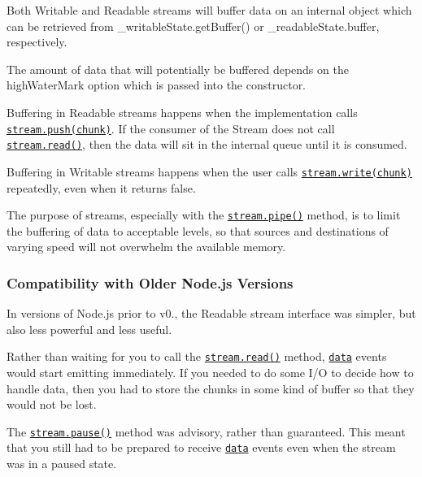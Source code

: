 Both Writable and Readable streams will buffer data on an internal object which can be retrieved from {\ttfamily \+\_\+writable\+State.\+get\+Buffer()} or {\ttfamily \+\_\+readable\+State.\+buffer}, respectively.

The amount of data that will potentially be buffered depends on the {\ttfamily high\+Water\+Mark} option which is passed into the constructor.

Buffering in Readable streams happens when the implementation calls \href{#stream_readable_push_chunk_encoding}{\tt {\ttfamily stream.\+push(chunk)}}. If the consumer of the Stream does not call \href{#stream_readable_read_size}{\tt {\ttfamily stream.\+read()}}, then the data will sit in the internal queue until it is consumed.

Buffering in Writable streams happens when the user calls \href{#stream_writable_write_chunk_encoding_callback}{\tt {\ttfamily stream.\+write(chunk)}} repeatedly, even when it returns {\ttfamily false}.

The purpose of streams, especially with the \href{#stream_readable_pipe_destination_options}{\tt {\ttfamily stream.\+pipe()}} method, is to limit the buffering of data to acceptable levels, so that sources and destinations of varying speed will not overwhelm the available memory.

\subsubsection*{Compatibility with Older Node.\+js Versions}

In versions of Node.\+js prior to v0., the Readable stream interface was simpler, but also less powerful and less useful.


\begin{DoxyItemize}
\item Rather than waiting for you to call the \href{#stream_readable_read_size}{\tt {\ttfamily stream.\+read()}} method, \href{#stream_event_data}{\tt {\ttfamily \textquotesingle{}data\textquotesingle{}}} events would start emitting immediately. If you needed to do some I/O to decide how to handle data, then you had to store the chunks in some kind of buffer so that they would not be lost.
\item The \href{#stream_readable_pause}{\tt {\ttfamily stream.\+pause()}} method was advisory, rather than guaranteed. This meant that you still had to be prepared to receive \href{#stream_event_data}{\tt {\ttfamily \textquotesingle{}data\textquotesingle{}}} events even when the stream was in a paused state.
\end{DoxyItemize}

